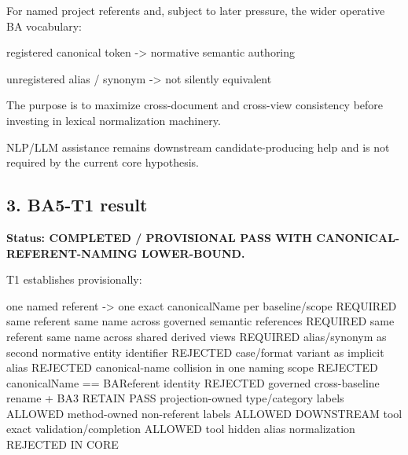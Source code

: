 \documentclass[
  10pt,
  a4paper,
]{article}
\newenvironment{Shaded}{}{}
\newcommand{\NormalTok}[1]{#1}
\begin{document}
For named project referents and, subject to later pressure, the wider
operative BA vocabulary:

\begin{Shaded}
\begin{Highlighting}[]
\NormalTok{registered canonical token}
\NormalTok{    {-}\textgreater{} normative semantic authoring}

\NormalTok{unregistered alias / synonym}
\NormalTok{    {-}\textgreater{} not silently equivalent}
\end{Highlighting}
\end{Shaded}

The purpose is to maximize cross-document and cross-view consistency
before investing in lexical normalization machinery.

NLP/LLM assistance remains downstream candidate-producing help and is
not required by the current core hypothesis.

\subsection{3. BA5-T1 result}\label{ba5-t1-result}

\textbf{Status: COMPLETED / PROVISIONAL PASS WITH
CANONICAL-REFERENT-NAMING LOWER-BOUND.}

T1 establishes provisionally:

\begin{Shaded}
\begin{Highlighting}[]
\NormalTok{one named referent {-}\textgreater{} one exact canonicalName per baseline/scope   REQUIRED}
\NormalTok{same referent same name across governed semantic references        REQUIRED}
\NormalTok{same referent same name across shared derived views                REQUIRED}
\NormalTok{alias/synonym as second normative entity identifier                REJECTED}
\NormalTok{case/format variant as implicit alias                              REJECTED}
\NormalTok{canonical{-}name collision in one naming scope                       REJECTED}
\NormalTok{canonicalName == BAReferent identity                                REJECTED}
\NormalTok{governed cross{-}baseline rename + BA3 RETAIN                         PASS}
\NormalTok{projection{-}owned type/category labels                              ALLOWED}
\NormalTok{method{-}owned non{-}referent labels                                   ALLOWED DOWNSTREAM}
\NormalTok{tool exact validation/completion                                   ALLOWED}
\NormalTok{tool hidden alias normalization                                    REJECTED IN CORE}
\end{Highlighting}
\end{Shaded}
\end{document}

